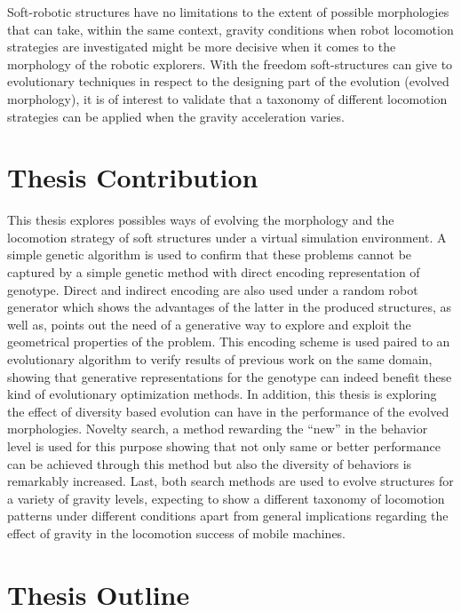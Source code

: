 Soft-robotic structures have no limitations to the extent of possible morphologies that can take, within the same context, gravity conditions when robot locomotion strategies are investigated might be more decisive when it comes to the morphology of the robotic explorers. With the freedom soft-structures can give to evolutionary techniques in respect to the designing part of the evolution (evolved morphology), it is of interest to validate that a taxonomy of different locomotion strategies can be applied when the gravity acceleration varies.



\section{Thesis Contribution}

This thesis explores possibles ways of evolving the morphology and the locomotion strategy of soft structures under a virtual simulation environment. A simple genetic algorithm is used to confirm that these problems cannot be captured by a simple genetic method with direct encoding representation of genotype. Direct and indirect encoding are also used under a random robot generator which shows the advantages of the latter in the produced structures, as well as, points out the need of a generative way to explore and exploit the geometrical properties of the problem. This encoding scheme is used paired to an evolutionary algorithm to verify results of previous work on the same domain, showing that generative representations for the genotype can indeed benefit these kind of evolutionary optimization methods. In addition, this thesis is exploring the effect of diversity based evolution can have in the performance of the evolved morphologies. Novelty search, a method rewarding the ``new'' in the behavior level is used for this purpose showing that not only same or better performance can be achieved through this method but also the diversity of behaviors is remarkably increased. Last, both search methods are used to evolve structures for a variety of gravity levels, expecting to show a different taxonomy of locomotion patterns under different conditions apart from general implications regarding the effect of gravity in the locomotion success of mobile machines.






\section{Thesis Outline}

